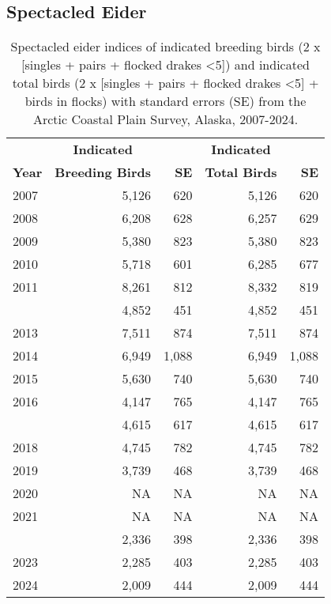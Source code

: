 \documentclass[
]{article}
\begin{document}
\subsection*{Spectacled Eider}\label{spectacled-eider-1}

\begingroup\fontsize{10}{12}\selectfont

\begin{longtable}[t]{lrrrr}

\caption{\label{tbl-SPEI}Spectacled eider indices of indicated breeding
birds (2 x {[}singles + pairs + flocked drakes \textless5{]}) and
indicated total birds (2 x {[}singles + pairs + flocked drakes
\textless5{]} + birds in flocks) with standard errors (SE) from the
Arctic Coastal Plain Survey, Alaska, 2007-2024.}

\tabularnewline

\\
\toprule
\multicolumn{1}{c}{\textbf{ }} & \multicolumn{1}{c}{\textbf{Indicated}} & \multicolumn{1}{c}{\textbf{ }} & \multicolumn{1}{c}{\textbf{Indicated}} & \multicolumn{1}{c}{\textbf{ }} \\
\cmidrule(l{3pt}r{3pt}){2-2} \cmidrule(l{3pt}r{3pt}){4-4}
\textbf{Year} & \textbf{Breeding Birds} & \textbf{SE} & \textbf{Total Birds} & \textbf{SE}\\
\midrule
2007 & 5,126 & 620 & 5,126 & 620\\
2008 & 6,208 & 628 & 6,257 & 629\\
2009 & 5,380 & 823 & 5,380 & 823\\
2010 & 5,718 & 601 & 6,285 & 677\\
2011 & 8,261 & 812 & 8,332 & 819\\
\addlinespace
2012 & 4,852 & 451 & 4,852 & 451\\
2013 & 7,511 & 874 & 7,511 & 874\\
2014 & 6,949 & 1,088 & 6,949 & 1,088\\
2015 & 5,630 & 740 & 5,630 & 740\\
2016 & 4,147 & 765 & 4,147 & 765\\
\addlinespace
2017 & 4,615 & 617 & 4,615 & 617\\
2018 & 4,745 & 782 & 4,745 & 782\\
2019 & 3,739 & 468 & 3,739 & 468\\
2020 & NA & NA & NA & NA\\
2021 & NA & NA & NA & NA\\
\addlinespace
2022 & 2,336 & 398 & 2,336 & 398\\
2023 & 2,285 & 403 & 2,285 & 403\\
2024 & 2,009 & 444 & 2,009 & 444\\
\bottomrule

\end{longtable}
\end{document}
